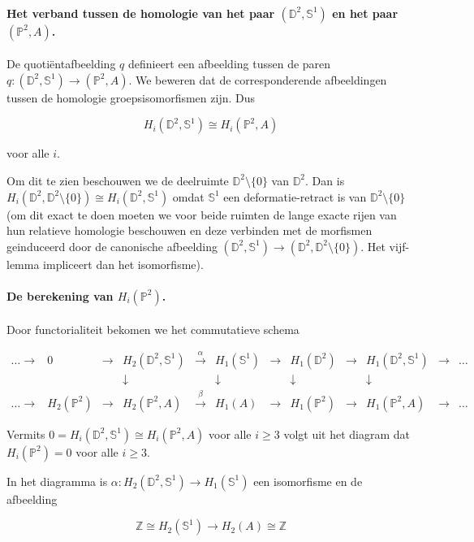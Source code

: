 \documentclass[12pt]{book}
\newcommand{\Z}{\mathbb{Z}}
\newcommand{\D}{\mathbb{D}}
\newcommand{\Sf}{\mathbb{S}}
\begin{document}
\paragraph{Het verband tussen de homologie van het paar $(\D^2, \Sf^1)$ en het paar $(\mathbb{P}^2, A)$.}

De quoti\"entafbeelding $q$ definieert een afbeelding tussen de paren $q:(\D^2, \Sf^1)\to (\mathbb{P}^2, A)$.
We beweren dat de corresponderende afbeeldingen tussen de homologie groepsisomorfismen zijn. Dus 

\[ H_i(\D^2, \Sf^1)\cong H_i(\mathbb{P}^2, A)\] 

voor alle $i$. 

Om dit te zien beschouwen we de deelruimte $\D^2\setminus\{0\}$ van $\D^2$. Dan is 
$H_i(\D^2, \D^2\setminus\{0\})\cong H_i(\D^2, \Sf^1)$ omdat $\Sf^1$ een deformatie-retract is van $\D^2\setminus\{0\}$
(om dit exact te doen moeten we voor beide ruimten de lange exacte rijen van hun relatieve homologie beschouwen en deze  verbinden met de morfismen geinduceerd door de canonische afbeelding $(\D^2, \Sf^1)\to (\D^2, \D^2\setminus\{0\})$. Het vijf-lemma impliceert dan het isomorfisme).

\paragraph{De berekening van $H_{i}(\mathbb{P}^2)$.}

Door functorialiteit bekomen we het commutatieve schema

$$\begin{array}{cccccccccccc}
\ldots \to & 0 & \to & H_2(\D^2, \Sf^1) & \stackrel{\alpha}{\to} & H_1(\Sf^{1}) & \to & H_1(\D^2) & \to & H_1(\D^2, \Sf^1) & \to & \ldots \\
& & & \downarrow & & \downarrow & & \downarrow & & \downarrow & & \\
\ldots \to & H_2(\mathbb{P}^2) & \to & H_2(\mathbb{P}^2, A) & \stackrel{\beta}{\to} & H_1(A) & \to & H_1(\mathbb{P}^2) & \to & H_1(\mathbb{P}^2, A) & \to & \ldots\end{array}$$

Vermits $0=H_{i}(\D^2, \Sf^1)\cong H_{i}(\mathbb{P}^2, A)$ voor alle $i\geq 3$ volgt uit het diagram dat $H_{i}(\mathbb{P}^2)=0$ voor alle $i\geq 3$. 

In het diagramma is $\alpha: H_2(\D^2, \Sf^1)\to H_{1}(\Sf^1)$ een isomorfisme en de afbeelding

\[\Z\cong H_2(\Sf^1)\to H_{2}(A)\cong \Z\] 
\end{document}
